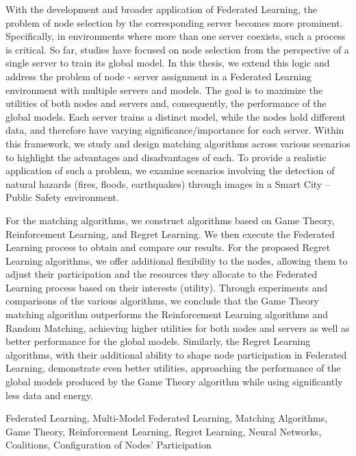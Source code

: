 \begin{abstracteng}

\vspace{-2cm}

With the development and broader application of Federated Learning, the problem of node selection by the corresponding server becomes more prominent. Specifically, in environments where more than one server coexists, such a process is critical. So far, studies have focused on node selection from the perspective of a single server to train its global model. In this thesis, we extend this logic and address the problem of node - server assignment in a Federated Learning environment with multiple servers and models. The goal is to maximize the utilities of both nodes and servers and, consequently, the performance of the global models. Each server trains a distinct model, while the nodes hold different data, and therefore have varying significance/importance for each server. Within this framework, we study and design matching algorithms across various scenarios to highlight the advantages and disadvantages of each. To provide a realistic application of such a problem, we examine scenarios involving the detection of natural hazards (fires, floods, earthquakes) through images in a Smart City – Public Safety environment.

For the matching algorithms, we construct algorithms based on Game Theory, Reinforcement Learning, and Regret Learning. We then execute the Federated Learning process to obtain and compare our results. For the proposed Regret Learning algorithms, we offer additional flexibility to the nodes, allowing them to adjust their participation and the resources they allocate to the Federated Learning process based on their interests (utility). Through experiments and comparisons of the various algorithms, we conclude that the Game Theory matching algorithm outperforms the Reinforcement Learning algorithms and Random Matching, achieving higher utilities for both nodes and servers as well as better performance for the global models. Similarly, the Regret Learning algorithms, with their additional ability to shape node participation in Federated Learning, demonstrate even better utilities, approaching the performance of the global models produced by the Game Theory algorithm while using significantly less data and energy.

\begin{keywordseng}
    Federated Learning, Multi-Model Federated Learning, Matching Algorithms, Game Theory, Reinforcement Learning, Regret Learning, Neural Networks, Coalitions, Configuration of Nodes' Participation
\end{keywordseng}
\end{abstracteng}

